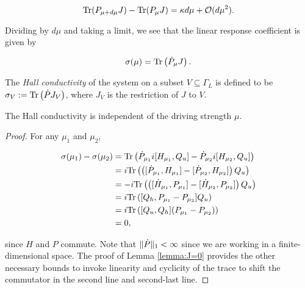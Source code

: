 \documentclass[12pt, letterpaper]{article}
\begin{document}
\[\text{Tr}(P_{\mu+d\mu}J) - \text{Tr}(P_\mu J) = \kappa d\mu + \mathcal{O}(d\mu^2).\]

Dividing by $d\mu$ and taking a limit, we see that the linear response coefficient is given by

\[\sigma(\mu) = \text{Tr}\left(\dot{P}_\mu J\right).\]

The \emph{Hall conductivity} of the system on a subset $V \subseteq \Gamma_L$ is defined to be $\sigma_V := \text{Tr}\left(\dot{P} J_V\right)$, where $J_V$ is the restriction of $J$ to $V$. 

\begin{proposition}
The Hall conductivity is independent of the driving strength $\mu$.
\label{prop:independent}
\end{proposition}
\begin{proof}


For any $\mu_1$ and $\mu_2$,



\[\begin{aligned}
\sigma(\mu_1) - \sigma(\mu_2) &= \text{Tr}\left( \dot{P}_{\mu_1} i[H_{\mu_1}, Q_u] - \dot{P}_{\mu_2}i[H_{\mu_2},Q_u]\right)\\
&= i\text{Tr}\left(\left([\dot{P}_{\mu_1}, H_{\mu_1}] - [\dot{P}_{\mu_2}, H_{\mu_2}]\right)Q_u\right)\\
&= - i\text{Tr}\left(\left([\dot{H}_{\mu_1}, P_{\mu_1}] - [\dot{H}_{\mu_2}, P_{\mu_2}]\right)Q_u\right)\\
&= i\text{Tr}\left( [Q_h, P_{\mu_1} - P_{\mu_2}]Q_u \right)\\
&= i\text{Tr}\left( [Q_u,Q_h]( P_{\mu_1} - P_{\mu_2})\right)\\
&= 0,
\end{aligned}\]

since $H$ and $P$ commute. Note that $\lVert \dot{P} \rVert_1<\infty$ since we are working in a finite-dimensional space. The proof of Lemma \ref{lemma:J=0} provides the other necessary bounds to invoke linearity and cyclicity of the trace to shift the commutator in the second line and second-last line.
\end{proof}
\end{document}
